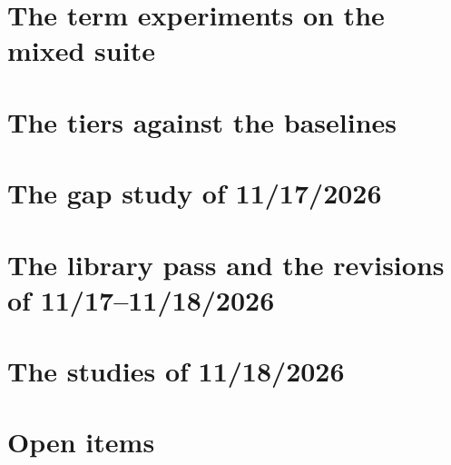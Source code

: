 \documentclass[12pt]{article}
\theoremstyle{plain}
\theoremstyle{definition}
\theoremstyle{remark}
\begin{document}
\section{The term experiments on the mixed suite}\label{sec:program}



\section{The tiers against the baselines}\label{sec:baselines}



\section{The gap study of 11/17/2026}\label{sec:gaps}



\section{The library pass and the revisions of 11/17--11/18/2026}\label{sec:libpass}



\section{The studies of 11/18/2026}\label{sec:studies}

\begingroup\setlength{\emergencystretch}{6em}

\endgroup

\section{Open items}\label{sec:open}


\end{document}
